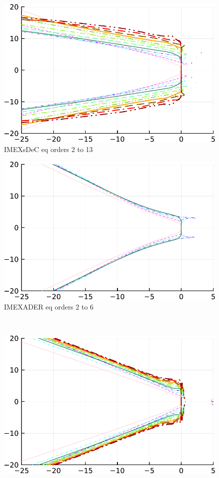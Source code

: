 \begin{figure}
\begin{minipage}[t]{0.32\textwidth}
		\centering
		\includegraphics[width=\textwidth, trim={0 0 0 0}, clip]{pdf/odepics/Minion_IMEXsDeC_eq_ord13-crop.pdf}
		IMEXsDeC eq orders 2 to 13
	\end{minipage}
	\begin{minipage}[t]{0.32\textwidth}
		\centering
		\includegraphics[width=\textwidth, trim={0 0 0 0}, clip]{pdf/odepics/Minion_IMEXADER_eq_ord6-crop.pdf}
		IMEXADER eq orders 2 to 6
	\end{minipage}\\[2mm]
	\begin{minipage}[t]{0.32\textwidth}
		\centering
		\includegraphics[width=\textwidth, trim={0 0 0 0}, clip]{pdf/odepics/Minion_IMEXDeC_GLB_ord13-crop.pdf}

\end{minipage}
\end{figure}

